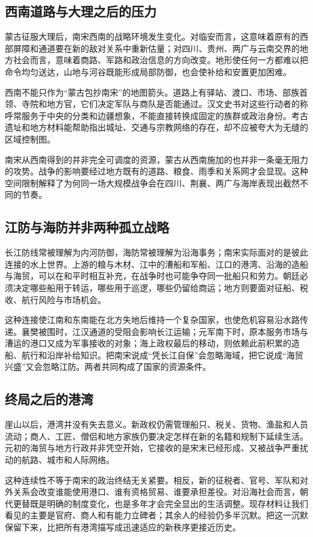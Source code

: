 \subsection{西南道路与大理之后的压力}

蒙古征服大理后，南宋西南的战略环境发生变化。对临安而言，这意味着原有的西部屏障和通道要在新的敌对关系中重新估量；对四川、贵州、两广与云南交界的地方社会而言，意味着商路、军路和政治信息的方向改变。地形使任何一方都难以把命令均匀送达，山地与河谷既能形成局部防御，也会使补给和安置更加困难。

西南不能只作为“蒙古包抄南宋”的地图箭头。道路上有驿站、渡口、市场、部族首领、寺院和地方官，它们决定军队与商队是否能通过。汉文史书对这些行动者的称呼常服务于中央的分类和边疆想象，不能直接转换成固定的族群或政治身份。考古遗址和地方材料能帮助指出城址、交通与宗教网络的存在，却不应被夸大为无缝的区域控制图。

南宋从西南得到的并非完全可调度的资源，蒙古从西南施加的也并非一条毫无阻力的攻势。战争的影响要经过地方既有的道路、粮食、雨季和关系网才会显现。这种空间限制解释了为何同一场大规模战争会在四川、荆襄、两广与海岸表现出截然不同的节奏。

\subsection{江防与海防并非两种孤立战略}

长江防线常被理解为内河防御，海防常被理解为沿海事务；南宋实际面对的是彼此连接的水上世界。上游的粮与木材、江中的漕船和军船、江口的港湾、沿海的造船与海贸，可以在和平时相互补充，在战争时也可能争夺同一批船只和劳力。朝廷必须决定哪些船用于转运，哪些用于巡逻，哪些仍留给商运；地方则要面对征船、税收、航行风险与市场机会。

这种连接使江南和东南能在北方失地后维持一个复杂国家，也使危机容易沿水路传递。襄樊被围时，江汉通道的受阻会影响长江运输；元军南下时，原本服务市场与漕运的港口又成为军事接收的对象；海上政权最后的移动，则依赖此前积累的造船、航行和沿岸补给知识。把南宋说成“凭长江自保”会忽略海域，把它说成“海贸兴盛”又会忽略江防。两者共同构成了国家的资源条件。

\subsection{终局之后的港湾}

崖山以后，港湾并没有失去意义。新政权仍需管理船只、税关、货物、渔盐和人员流动；商人、工匠、僧侣和地方家族仍要决定怎样在新的名籍和规制下延续生活。元初的海贸与地方行政并非凭空开始，它接收的是宋末已经形成、又被战争严重扰动的航路、城市和人际网络。

这种连续性不等于南宋的政治终结无关紧要。相反，新的征税者、官号、军队和对外关系会改变谁能使用港口、谁有资格贸易、谁要承担差役。对沿海社会而言，朝代更替既是明确的制度变化，也是多年才会完全显出的生活调整。现存材料让我们看见的主要是官府、商人和有能力立碑者；其余人的经验仍多半沉默。把这一沉默保留下来，比把所有港湾描写成迅速适应的新秩序更接近历史。
